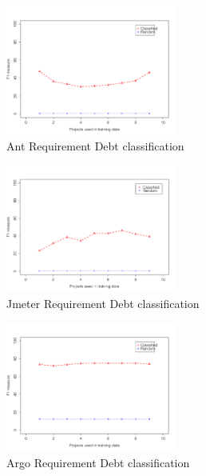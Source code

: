 \begin{figure}[thb!]
  \centering
  \includegraphics[width=0.50\textwidth]{figures/implementation_ant.pdf}
  \vspace{-3mm}
  \caption{Ant Requirement Debt classification}
  \label{fig:implementation_ant}
\end{figure}

\begin{figure}[thb!]
  \centering
  \includegraphics[width=0.50\textwidth]{figures/implementation_jmeter.pdf}
  \vspace{-3mm}
  \caption{Jmeter Requirement Debt classification}
  \label{fig:implementation_jmeter}
\end{figure}

\begin{figure}[thb!]
  \centering
  \includegraphics[width=0.50\textwidth]{figures/implementation_argo.pdf}
  \vspace{-3mm}
  \caption{Argo Requirement Debt classification}
  \label{fig:implementation_argo}
\end{figure}

